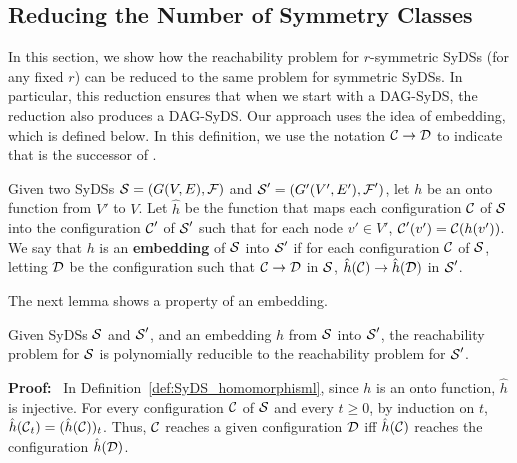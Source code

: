 \subsection{Reducing the Number of Symmetry Classes}
\label{sse:embedding}

In this section, we show how the reachability problem for
$r$-symmetric SyDSs (for any fixed $r$)
can be reduced to the same problem for symmetric SyDSs.
In particular, this reduction ensures that when we start
with a DAG-SyDS, the reduction also produces a DAG-SyDS.
Our approach uses the idea of embedding, which is defined below.
In this definition, we use the notation
$\mbox{$\mathcal{C}$}{} \rightarrow \mbox{$\mathcal{D}$}$ to indicate that \cald{} is
the successor of \calc.

\begin{definition}\label{def:SyDS_homomorphisml}
Given two SyDSs $\mbox{$\mathcal{S}$} = (G(V,E), \mbox{$\mathcal{F}$})$ and $\mbox{$\mathcal{S}$}' = (G'(V',E'), \mbox{$\mathcal{F}$}')$,
let $h$ be an onto function from $V'$ to $V$.
Let $\hat{h}$ be the function that maps each configuration $\mbox{$\mathcal{C}$}$ of $\mbox{$\mathcal{S}$}$
into the configuration $\mbox{$\mathcal{C}$}'$ of $\mbox{$\mathcal{S}$}'$ 
such that for each node $v' \in V'$, 
$\mbox{$\mathcal{C}$}'(v') = \mbox{$\mathcal{C}$}(h(v'))$.
We say that $h$ is an \textbf{embedding} of $\mbox{$\mathcal{S}$}$ into $\mbox{$\mathcal{S}$}'$
if for each configuration $\mbox{$\mathcal{C}$}$ of $\mbox{$\mathcal{S}$}$,
letting $\mbox{$\mathcal{D}$}$  be the configuration such that 
$\mbox{$\mathcal{C}$} \rightarrow \mbox{$\mathcal{D}$}$ in $\mbox{$\mathcal{S}$}$,
$\hat{h}(\mbox{$\mathcal{C}$}) \rightarrow \hat{h}(\mbox{$\mathcal{D}$})$ in $\mbox{$\mathcal{S}$}'$.
\end{definition}

\noindent
The next lemma shows a property of an embedding.

\begin{lemma}\label{lem:embedding_reachability}
 Given SyDSs $\mbox{$\mathcal{S}$}$ and $\mbox{$\mathcal{S}$}'$, and an embedding $h$ from $\mbox{$\mathcal{S}$}$ into  $\mbox{$\mathcal{S}$}'$,
the reachability problem for $\mbox{$\mathcal{S}$}$ is polynomially reducible
to the reachability problem for $\mbox{$\mathcal{S}$}'$.
\end{lemma}

\noindent
\textbf{Proof:}~
In Definition~\ref{def:SyDS_homomorphisml},
since $h$ is an onto function, $\hat{h}$  is injective.
For every configuration $\mbox{$\mathcal{C}$}$ of $\mbox{$\mathcal{S}$}$ and every $t \geq 0$,
by induction on $t$,
$\hat{h}(\mbox{$\mathcal{C}$}_t) = (\hat{h}(\mbox{$\mathcal{C}$}))_t $.
Thus, $\mbox{$\mathcal{C}$}$ reaches a given configuration $\mbox{$\mathcal{D}$}$
iff $\hat{h}(\mbox{$\mathcal{C}$})$ reaches the configuration $\hat{h}(\mbox{$\mathcal{D}$})$.
\QED


